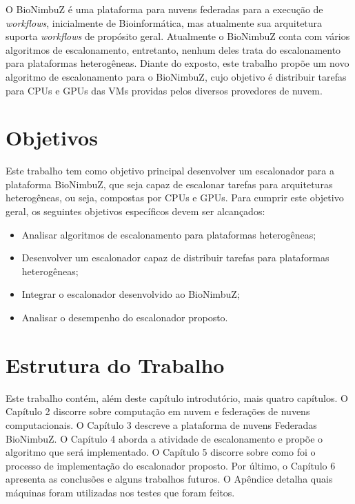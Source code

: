 O BioNimbuZ é uma plataforma para nuvens federadas para a execução de \textit{workflows}, inicialmente de Bioinformática, mas atualmente sua arquitetura suporta \textit{workflows} de propósito geral. Atualmente o BioNimbuZ conta com vários algoritmos de escalonamento, entretanto, nenhum deles trata do escalonamento para plataformas heterogêneas. Diante do exposto, este trabalho propõe um novo algoritmo de escalonamento para o BioNimbuZ, cujo objetivo é distribuir tarefas para \acrshort{CPU}s e \acrshort{GPU}s das \acrfull{VM}s providas pelos diversos provedores de nuvem.


\section{Objetivos}
Este trabalho tem como objetivo principal desenvolver um escalonador para a plataforma BioNimbuZ, que seja capaz de escalonar tarefas para arquiteturas heterogêneas, ou seja, compostas por \acrshort{CPU}s e \acrshort{GPU}s. Para cumprir este objetivo geral, os seguintes objetivos específicos devem ser alcançados: 

\begin{itemize}
	\item Analisar algoritmos de escalonamento para plataformas heterogêneas;
	\item Desenvolver um escalonador capaz de distribuir tarefas para plataformas heterogêneas;
	\item Integrar o escalonador desenvolvido ao BioNimbuZ;
	\item Analisar o desempenho do escalonador proposto.
\end{itemize}

\section{Estrutura do Trabalho}
Este trabalho contém, além deste capítulo introdutório, mais quatro capítulos. O Capítulo 2 discorre sobre computação em nuvem e federações de nuvens computacionais. O Capítulo 3 descreve a plataforma de nuvens Federadas BioNimbuZ. O Capítulo 4 aborda a atividade de escalonamento e propõe o algoritmo que será implementado. O Capítulo 5 discorre sobre como foi o processo de implementação do escalonador proposto. Por último, o Capítulo 6 apresenta as conclusões e alguns trabalhos futuros. O Apêndice detalha quais máquinas foram utilizadas nos testes que foram feitos.